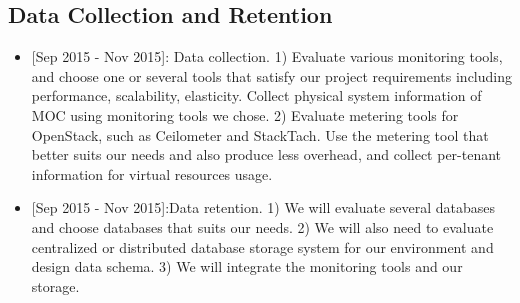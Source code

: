 \subsection{Data Collection and Retention}

\begin{itemize}
\item{[Sep 2015 - Nov 2015]:} Data collection. 1) Evaluate various monitoring tools, and choose one or several tools that satisfy our project requirements including performance, scalability, elasticity. Collect physical system information of MOC using monitoring tools we chose. 2) Evaluate metering tools for OpenStack, such as Ceilometer and StackTach. Use the metering tool that better suits our needs and also produce less overhead, and collect per-tenant information for virtual resources usage. 
\item{[Sep 2015 - Nov 2015]:}Data retention. 1) We will evaluate several databases and choose databases that suits our needs. 2) We will also need to evaluate centralized or distributed database storage system for our environment and design data schema. 3) We will integrate the monitoring tools and our storage.
\end{itemize}